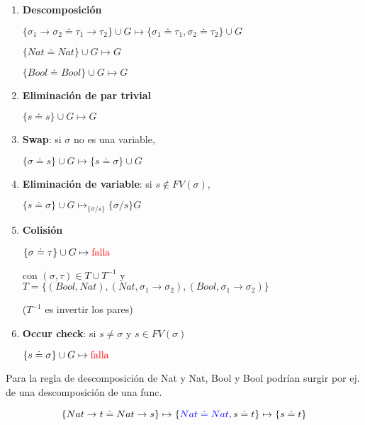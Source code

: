 \documentclass{report}
\theoremstyle{definition} %
\newcommand{\tfunc}[2]{#1 \to #2}
\newcommand{\changed}[1]{\textcolor{red}{#1}}
\newcommand{\select}[1]{\textcolor{blue}{#1}}
\newcommand{\sustfor}[2]{#1/#2} %
\newcommand{\unify}[2]{#1 \doteq #2}
\newcommand{\simpSust}[1]{\mapsto_{#1}}
\newcommand{\simp}{\mapsto}
\begin{document}
\newcommand{\inferRule}[3]{ \{ \unify{#1}{#2} \} \cup G \simp #3}
\begin{enumerate}
    \item \textbf{Descomposición}

    $\inferRule
        {\tfunc{\sigma_1}{\sigma_2}}
        {\tfunc{\tau_1}{\tau_2}}
        {\{ \unify{\sigma_1}{\tau_1}, \unify{\sigma_2}{\tau_2} \} \cup G}
    $
    
    $\inferRule{Nat}{Nat}{G}$

    $\inferRule{Bool}{Bool}{G}$

    \item \textbf{Eliminación de par trivial}
    
    $\inferRule{s}{s}{G}$

    \item \textbf{Swap}: si $\sigma$ no es una variable,
    
    $\inferRule{\sigma}{s}{ \{ \unify{s}{\sigma} \} \cup G}$

    \item \textbf{Eliminación de variable}: si $s \notin FV(\sigma)$,
    
    $
        \{ \unify{s}{\sigma} \} \cup G
        \simpSust{\{ \sustfor{\sigma}{s}\}}
        \{\sustfor{\sigma}{s}\} G
    $

    \item \textbf{Colisión}
    
    $\inferRule{\sigma}{\tau}{\changed{\text{falla}}}$
    
    con $(\sigma, \tau) \in T \cup T^{-1}$ y
    $T = \{
        (Bool, Nat),
        (Nat, \tfunc{\sigma_1}{\sigma_2}),
        (Bool, \tfunc{\sigma_1}{\sigma_2})
    \}$

    ($T^{-1}$ es invertir los pares)

    \item \textbf{Occur check}: si $s \neq \sigma$ y $s \in FV(\sigma)$
    
    $\inferRule{s}{\sigma}{\changed{\text{falla}}}$
\end{enumerate}

Para la regla de descomposición de Nat y Nat, Bool y Bool podrían surgir por ej.
de una descomposición de una func.

\[
    \{ \unify{\tfunc{Nat}{t}}{\tfunc{Nat}{s}} \}
    \simp
    \{ \select{\unify{Nat}{Nat}}, \unify{s}{t} \}
    \simp
    \{ \unify{s}{t} \}
\]
\end{document}
